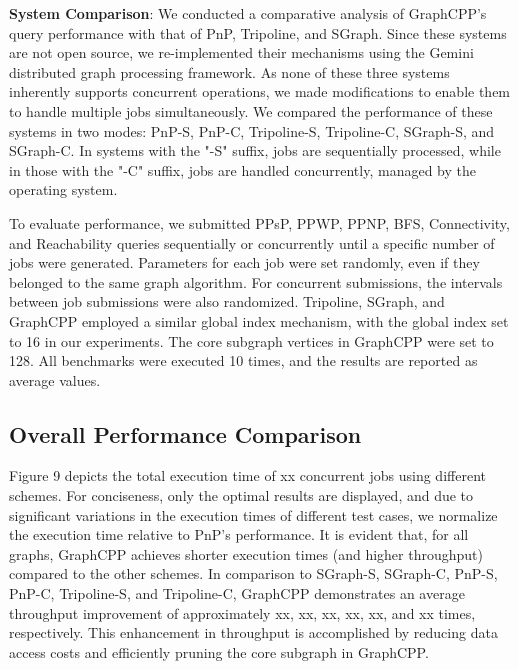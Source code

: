 \documentclass[lettersize,journal]{IEEEtran} %
\begin{document}
{\bf{System Comparison}}: We conducted a comparative analysis of GraphCPP's query performance with that of PnP, Tripoline, and SGraph. Since these systems are not open source, we re-implemented their mechanisms using the Gemini distributed graph processing framework. As none of these three systems inherently supports concurrent operations, we made modifications to enable them to handle multiple jobs simultaneously. We compared the performance of these systems in two modes: PnP-S, PnP-C, Tripoline-S, Tripoline-C, SGraph-S, and SGraph-C. In systems with the "-S" suffix, jobs are sequentially processed, while in those with the "-C" suffix, jobs are handled concurrently, managed by the operating system.

To evaluate performance, we submitted PPsP, PPWP, PPNP, BFS, Connectivity, and Reachability queries sequentially or concurrently until a specific number of jobs were generated. Parameters for each job were set randomly, even if they belonged to the same graph algorithm. For concurrent submissions, the intervals between job submissions were also randomized. Tripoline, SGraph, and GraphCPP employed a similar global index mechanism, with the global index set to 16 in our experiments. The core subgraph vertices in GraphCPP were set to 128. All benchmarks were executed 10 times, and the results are reported as average values.
    

\subsection{Overall Performance Comparison}
Figure 9 depicts the total execution time of xx concurrent jobs using different schemes. For conciseness, only the optimal results are displayed, and due to significant variations in the execution times of different test cases, we normalize the execution time relative to PnP's performance. It is evident that, for all graphs, GraphCPP achieves shorter execution times (and higher throughput) compared to the other schemes. In comparison to SGraph-S, SGraph-C, PnP-S, PnP-C, Tripoline-S, and Tripoline-C, GraphCPP demonstrates an average throughput improvement of approximately xx, xx, xx, xx, xx, and xx times, respectively. This enhancement in throughput is accomplished by reducing data access costs and efficiently pruning the core subgraph in GraphCPP.
\end{document}
